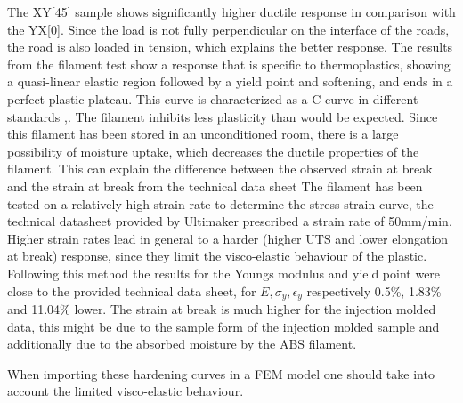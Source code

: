 The XY[45] sample shows significantly higher ductile response in comparison with the YX[0]. Since the load is not fully perpendicular on the interface of the roads, the road is also loaded in tension, which explains the better response.
The results from the filament test show a response that is specific to thermoplastics, showing a quasi-linear elastic region followed by a yield point and softening, and ends in a perfect plastic plateau. This curve is characterized as a C curve in different standards \cite{Afd2016NEN-EN-ISO527-2},\cite{Fahrenholz2018TheZwick/Roell}. The filament inhibits less plasticity than would be expected\cite{Rodriguez2001MechanicalInvestigation}. Since this filament has been stored in an unconditioned room, there is a large possibility of moisture uptake, which decreases the ductile properties of the filament\cite{Turner2014AModeling}. This can explain the difference between the observed strain at break and the strain at break from the technical data sheet \cite{TechnicalUM}
The filament has been tested on a relatively high strain rate to determine the stress strain curve, the technical datasheet provided by Ultimaker prescribed a strain rate of 50mm/min. Higher strain rates lead in general to a harder (higher UTS and lower elongation at break) response, since they limit the visco-elastic behaviour of the plastic. Following this method the results for the Youngs modulus and yield point were close to the provided technical data sheet, for $E, \sigma_y, \epsilon_y$ respectively 0.5\%, 1.83\% and 11.04\% lower. The strain at break is much higher for the injection molded data, this might be due to the sample form of the injection molded sample and additionally due to the absorbed moisture by the ABS filament.  

When importing these hardening curves in a FEM model one should take into account the limited visco-elastic behaviour. 

